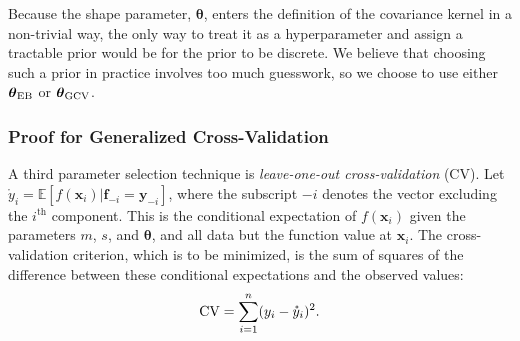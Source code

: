 \documentclass{svjour3}                     %
\newcommand{\bm}[1]{\boldsymbol{#1}}
\newcommand{\Ex}{\mathbb{E}}
\newcommand{\vtheta}{{\bm{\theta}}}
\newcommand{\vf}{\bm{f}}
\newcommand{\vx}{\bm{x}}
\newcommand{\vy}{\bm{y}}
\newcommand{\MLE}{\textup{EB}}
\newcommand{\GCV}{\textup{GCV}}
\begin{document}
Because the shape parameter, $\vtheta$, enters the definition of the covariance kernel in a non-trivial way, the only way to treat it as a hyperparameter and assign a tractable prior would be for the prior to be discrete.  We believe that choosing such a prior in practice involves too much guesswork, so we choose to use either $\vtheta_\MLE$ or $\vtheta_\GCV$.


\subsubsection{Proof for Generalized Cross-Validation} \label{sec:GCV}
A third parameter selection technique is \emph{leave-one-out cross-validation} (CV).  Let $\mathring{y}_i = \Ex[f(\vx_i ) | \vf_{-i} = \vy_{-i}]$, where the subscript $-i$ denotes the vector excluding the $i^{\text{th}}$ component.  This is the conditional expectation of $f(\vx_i )$ given the parameters $m$, $s$, and $\vtheta$, and all data but the function value at $\vx_i$.  The cross-validation criterion, which is to be minimized, is the sum of squares of the difference between these conditional expectations and the observed values:
\begin{align} \label{FJH:eq:CVA}
\textup{CV} = \sum_{i=1}^n (y_i - \mathring{y}_i)^2.
\end{align}
\end{document}
